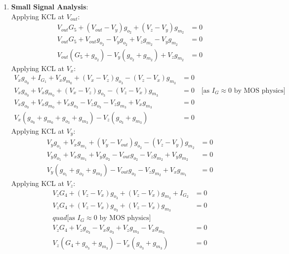 \begin{enumerate}
\begin{align*}
                                                                  = \frac{W_2 L_3}{L_2 W_3} \\
    \end{align*}
  \item \textbf{Small Signal Analysis}:\\
    Applying KCL at $V_{out}$:
    \begin{align*}
      V_{out}G_5 + (V_{out} - V_{y})g_{o_2} + (V_{z} - V_{y})g_{m_2} &= 0 \\
      V_{out}G_5 + V_{out}g_{o_2} - V_{y}g_{o_2} + V_{z}g_{m_2} - V_{y}g_{m_2} &= 0 \\
      V_{out}(G_5 + g_{o_2}) - V_{y}(g_{o_2} + g_{m_2}) + V_{z}g_{m_2} &= 0 \tag{9}
    \end{align*}
    Applying KCL at $V_{x}$:
    \begin{align*}
      V_{x}g_{o_0} + I_{G_1} + V_{x}g_{m_0} + (V_{x} - V_{z})g_{o_3} - (V_{z} - V_{x})g_{m_3} &= 0 \\
      V_{x}g_{o_0} + V_{x}g_{m_0} + (V_{x} - V_{z})g_{o_3} - (V_{z} - V_{x})g_{m_3} &= 0 \quad \text{[as } I_{G} \approx 0 \text{ by MOS physics]} \\
      V_{x}g_{o_0} + V_{x}g_{m_0} + V_{x}g_{o_3} - V_{z}g_{o_3} - V_{z}g_{m_3} + V_{x}g_{m_3} &= 0 \\
      V_{x}(g_{o_0} + g_{m_0} + g_{o_3} + g_{m_3}) - V_{z}(g_{o_3} + g_{m_3}) &= 0 \tag{10}
    \end{align*}
    Applying KCL at $V_{y}$:
    \begin{align*}
      V_{y}g_{o_1} + V_{x}g_{m_1} + (V_{y} - V_{out})g_{o_2} - (V_{z} - V_{y})g_{m_2} &= 0 \\
      V_{y}g_{o_1} + V_{x}g_{m_1} + V_{y}g_{o_2} - V_{out}g_{o_2} - V_{z}g_{m_2} + V_{y}g_{m_2} &= 0 \\
      V_{y}(g_{o_1} + g_{o_2} + g_{m_2}) - V_{out}g_{o_2} - V_{z}g_{m_2} + V_{x}g_{m_1} &= 0 \tag{11}
    \end{align*}
    Applying KCL at $V_{z}$:
    \begin{align*}
      V_{z}G_4 + (V_{z} - V_{x})g_{o_3} + (V_{z} - V_{x})g_{m_3} + I_{G_2} &= 0 \\
      V_{z}G_4 + (V_{z} - V_{x})g_{o_3} + (V_{z} - V_{x})g_{m_3} &= 0 \\quad \text{[as } I_{G} \approx 0 \text{ by MOS physics]} \\
      V_{z}G_4 + V_{z}g_{o_3} - V_{x}g_{o_3} + V_{z}g_{m_3} - V_{x}g_{m_3} &= 0 \\
      V_{z}(G_4 + g_{o_3} + g_{m_3}) - V_{x}(g_{o_3} + g_{m_3}) &= 0 \tag{12}

\end{align*}
\end{enumerate}

